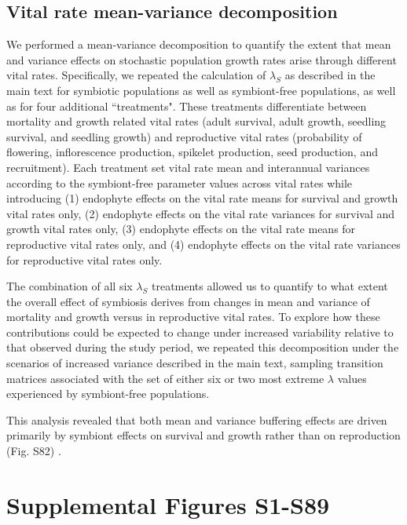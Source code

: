 \documentclass[lineno, sn-basic]{sn-jnl}%
\begin{document}
\subsection{Vital rate mean-variance decomposition}\label{SupMethods5}
We performed a mean-variance decomposition to quantify the extent that mean and variance effects on stochastic population growth rates arise through different vital rates. 
Specifically, we repeated the calculation of $\lambda_S$ as described in the main text for symbiotic populations as well as symbiont-free populations, as well as for four additional ``treatments". 
These treatments differentiate between mortality and growth related vital rates (adult survival, adult growth, seedling survival, and seedling growth) and reproductive vital rates (probability of flowering, inflorescence production, spikelet production, seed production, and recruitment). 
Each treatment set vital rate mean and interannual variances according to the symbiont-free parameter values across vital rates while introducing (1) endophyte effects on the vital rate means for survival and growth vital rates only, (2) endophyte effects on the vital rate variances for survival and growth vital rates only, (3) endophyte effects on the vital rate means for reproductive vital rates only, and (4) endophyte effects on the vital rate variances for reproductive vital rates only.

The combination of all six $\lambda_S$ treatments allowed us to quantify to what extent the overall effect of symbiosis derives from changes in mean and variance of mortality and growth versus in reproductive vital rates. 
To explore how these contributions could be expected to change under increased variability relative to that observed during the study period, we repeated this decomposition under the scenarios of increased variance described in the main text, sampling transition matrices associated with the set of either six or two most extreme $\lambda$ values experienced by symbiont-free populations.

This analysis revealed that both mean and variance buffering effects are driven primarily by symbiont effects on survival and growth rather than on reproduction (Fig. S82) .

\newpage


\section{Supplemental Figures S1-S89}\label{Supfigs}
\end{document}
